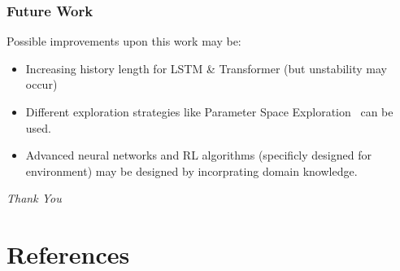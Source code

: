 \documentclass{beamer}
\begin{document}
\begin{frame}
\frametitle{Future Work}
Possible improvements upon this work may be:
\begin{itemize}
	\item Increasing history length for LSTM \& Transformer (but unstability may occur)
	\item Different exploration strategies like Parameter Space Exploration~\cite{plappert_parameter_2018} can be used. 
	\item Advanced neural networks and RL algorithms (specificly designed for environment) may be designed by incorprating domain knowledge. 
\end{itemize}
\end{frame}

\begin{frame}{}
\centering \Huge
\emph{Thank You}
\end{frame}


\section[References]{References}
\begin{frame}[t,allowframebreaks]
%

%

\end{frame}
\end{document}
